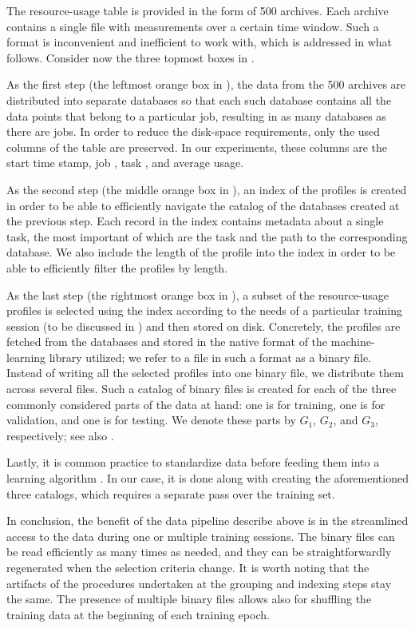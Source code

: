The resource-usage table is provided in the form of 500 archives. Each archive
contains a single file with measurements over a certain time window. Such a
format is inconvenient and inefficient to work with, which is addressed in what
follows. Consider now the three topmost boxes in .

As the first step (the leftmost orange box in ), the data
from the 500 archives are distributed into separate databases so that each such
database contains all the data points that belong to a particular job, resulting
in as many databases as there are jobs. In order to reduce the disk-space
requirements, only the used columns of the table are preserved. In our
experiments, these columns are the start time stamp, job , task ,
and average  usage.

As the second step (the middle orange box in ), an index
of the profiles is created in order to be able to efficiently navigate the
catalog of the databases created at the previous step. Each record in the index
contains metadata about a single task, the most important of which are the task
 and the path to the corresponding database. We also include the length
of the profile into the index in order to be able to efficiently filter the
profiles by length.

As the last step (the rightmost orange box in ), a subset
of the resource-usage profiles is selected using the index according to the
needs of a particular training session (to be discussed in
) and then stored on disk. Concretely, the profiles are
fetched from the databases and stored in the native format of the
machine-learning library utilized; we refer to a file in such a format as a
binary file. Instead of writing all the selected profiles into one binary file,
we distribute them across several files. Such a catalog of binary files is
created for each of the three commonly considered parts \cite{hastie2013} of the
data at hand: one is for training, one is for validation, and one is for
testing. We denote these parts by $G_1$, $G_2$, and $G_3$, respectively; see
also .

Lastly, it is common practice to standardize data before feeding them into a
learning algorithm \cite{hastie2013}. In our case, it is done along with
creating the aforementioned three catalogs, which requires a separate pass over
the training set.

In conclusion, the benefit of the data pipeline describe above is in the
streamlined access to the data during one or multiple training sessions. The
binary files can be read efficiently as many times as needed, and they can be
straightforwardly regenerated when the selection criteria change. It is worth
noting that the artifacts of the procedures undertaken at the grouping and
indexing steps stay the same. The presence of multiple binary files allows also
for shuffling the training data at the beginning of each training epoch.

